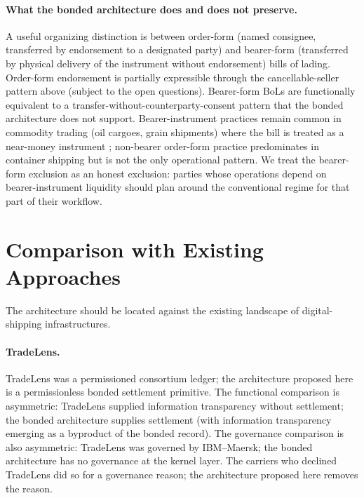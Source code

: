 \documentclass[11pt,a4paper]{article}
\theoremstyle{definition}
\theoremstyle{remark}
\begin{document}
\paragraph{What the bonded architecture does and does not preserve.}
A useful organizing distinction is between order-form (named
consignee, transferred by endorsement to a designated party)
and bearer-form (transferred by physical delivery of the
instrument without endorsement) bills of lading. Order-form
endorsement is partially expressible through the cancellable-seller
pattern above (subject to the open questions). Bearer-form BoLs
are functionally equivalent to a
transfer-without-counterparty-consent pattern that the bonded
architecture does not support. Bearer-instrument practices
remain common in commodity trading (oil cargoes, grain shipments)
where the bill is treated as a near-money instrument
\citep{goode_gullifer_2017}; non-bearer order-form practice
predominates in container shipping but is not the only
operational pattern. We treat the bearer-form exclusion as an
honest exclusion: parties whose operations depend on
bearer-instrument liquidity should plan around the conventional
regime for that part of their workflow.

\section{Comparison with Existing Approaches}
\label{sec:comparison}

The architecture should be located against the existing landscape
of digital-shipping infrastructures.

\paragraph{TradeLens.}
TradeLens was a permissioned consortium ledger; the architecture
proposed here is a permissionless bonded settlement primitive.
The functional comparison is asymmetric: TradeLens supplied
information transparency without settlement; the bonded
architecture supplies settlement (with information transparency
emerging as a byproduct of the bonded record). The governance
comparison is also asymmetric: TradeLens was governed by
IBM--Maersk; the bonded architecture has no governance at the
kernel layer. The carriers who declined TradeLens did so for a
governance reason; the architecture proposed here removes the
reason.
\end{document}
